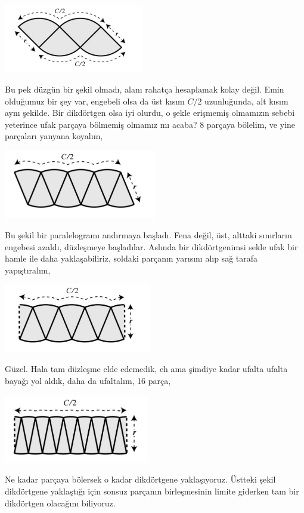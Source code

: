 \documentclass[12pt,fleqn]{article}\usepackage{../../common}
\begin{document}
\includegraphics[height=3cm]{circ_3.png}

Bu pek düzgün bir şekil olmadı, alanı rahatça hesaplamak kolay değil. Emin
olduğumuz bir şey var, engebeli olsa da üst kısım $C/2$ uzunluğunda, alt
kısım aynı şekilde. Bir dikdörtgen olsa iyi olurdu, o şekle erişmemiş
olmamızın sebebi yeterince ufak parçaya bölmemiş olmamız mı acaba? 8
parçaya bölelim, ve yine parçaları yanyana koyalım,

\includegraphics[height=3cm]{circ_4.png}

Bu şekil bir paralelogramı andırmaya başladı. Fena değil, üst, alttaki
sınırların engebesi azaldı, düzleşmeye başladılar. Aslında bir
dikdörtgenimsi sekle ufak bir hamle ile daha yaklaşabiliriz, soldaki
parçanın yarısını alıp sağ tarafa yapıştıralım,

\includegraphics[height=3cm]{circ_5.png}

Güzel. Hala tam düzleşme elde edemedik, eh ama şimdiye kadar ufalta ufalta
bayağı yol aldık, daha da ufaltalım, 16 parça,

\includegraphics[height=3cm]{circ_6.png}

Ne kadar parçaya bölersek o kadar dikdörtgene yaklaşıyoruz. Üstteki şekil
dikdörtgene yaklaştığı için sonsuz parçanın birleşmesinin limite giderken
tam bir dikdörtgen olacağını biliyoruz. 
\end{document}
